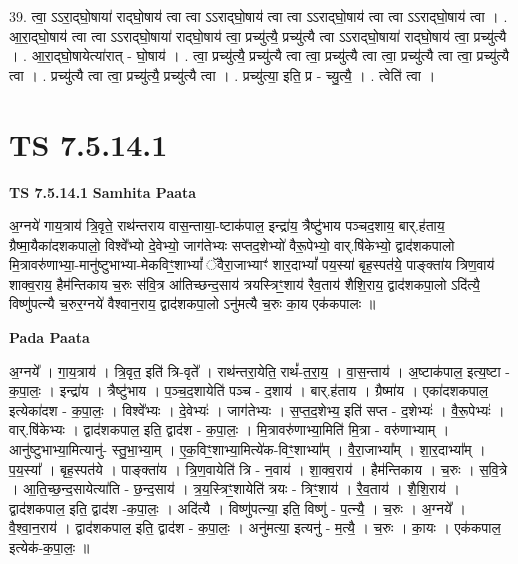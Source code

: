 \documentclass[17pt]{extarticle}
\begin{document}
39. त्वा॒ ऽऽरा॒द्‍घो॒षाया॑ राद्‍घो॒षाय॑ त्वा त्वा ऽऽराद्‍घो॒षाय॑ त्वा त्वा ऽऽराद्‍घो॒षाय॑ त्वा त्वा ऽऽराद्‍घो॒षाय॑ त्वा । . आ॒रा॒द्‍घो॒षाय॑ त्वा त्वा ऽऽराद्‍घो॒षाया॑ राद्‍घो॒षाय॑ त्वा॒ प्रच्यु॑त्यै॒ प्रच्यु॑त्यै त्वा ऽऽराद्‍घो॒षाया॑ राद्‍घो॒षाय॑ त्वा॒ प्रच्यु॑त्यै । . आ॒रा॒द्‍घो॒षायेत्या॑रात् - घो॒षाय॑ । . त्वा॒ प्रच्यु॑त्यै॒ प्रच्यु॑त्यै त्वा त्वा॒ प्रच्यु॑त्यै त्वा त्वा॒ प्रच्यु॑त्यै त्वा त्वा॒ प्रच्यु॑त्यै त्वा । . प्रच्यु॑त्यै त्वा त्वा॒ प्रच्यु॑त्यै॒ प्रच्यु॑त्यै त्वा । . प्रच्यु॑त्या॒ इति॒ प्र - च्यु॒त्यै॒ । . त्वेति॑ त्वा । \newline
\pagebreak
{}

\section{ TS 7.5.14.1 }

\textbf{TS 7.5.14.1 } \newline
\textbf{Samhita Paata} \newline

अ॒ग्नये॑ गाय॒त्राय॑ त्रि॒वृते॒ राथ॑न्तराय वास॒न्ताया॒-ष्टाक॑पाल॒ इन्द्रा॑य॒ त्रैष्टु॑भाय पञ्चद॒शाय॒ बार्.ह॑ताय॒ ग्रैष्मा॒यैका॑दशकपालो॒ विश्वे᳚भ्यो दे॒वेभ्यो॒ जाग॑तेभ्यः सप्तद॒शेभ्यो॑ वैरू॒पेभ्यो॒ वार्.षि॑केभ्यो॒ द्वाद॑शकपालो मि॒त्रावरु॑णाभ्या॒-मानु॑ष्टुभाभ्या-मेकविꣳ॒॒शाभ्यां᳚ ॅवैरा॒जाभ्याꣳ॑ शार॒दाभ्यां᳚ पय॒स्या॑ बृह॒स्पत॑ये॒ पाङ्क्ता॑य त्रिण॒वाय॑ शाक्व॒राय॒ हैम॑न्तिकाय च॒रुः स॑वि॒त्र आ॑तिच्छन्द॒साय॑ त्रयस्त्रिꣳ॒॒शाय॑ रैव॒ताय॑ शैशि॒राय॒ द्वाद॑शकपा॒लो ऽदि॑त्यै॒ विष्णु॑पत्न्यै च॒रुर॒ग्नये॑ वैश्वान॒राय॒ द्वाद॑शकपा॒लो ऽनु॑मत्यै च॒रुः का॒य एक॑कपालः ॥ \newline

\textbf{Pada Paata} \newline

अ॒ग्नये᳚ । गा॒य॒त्राय॑ । त्रि॒वृत॒ इति॑ त्रि-वृते᳚ । राथ॑न्तरा॒येति॒ राथं᳚-त॒रा॒य॒ । वा॒स॒न्ताय॑ । अ॒ष्टाक॑पाल॒ इत्य॒ष्टा - क॒पा॒लः॒ । इन्द्रा॑य । त्रैष्टु॑भाय । प॒ञ्च॒द॒शायेति॑ पञ्च - द॒शाय॑ । बार्.ह॑ताय । ग्रैष्मा॑य । एका॑दशकपाल॒ इत्येका॑दश - क॒पा॒लः॒ । विश्वे᳚भ्यः । दे॒वेभ्यः॑ । जाग॑तेभ्यः । स॒प्त॒द॒शेभ्य॒ इति॑ सप्त - द॒शेभ्यः॑ । वै॒रू॒पेभ्यः॑ । वार्.षि॑केभ्यः । द्वाद॑शकपाल॒ इति॒ द्वाद॑श - क॒पा॒लः॒ । मि॒त्रावरु॑णाभ्या॒मिति॑ मि॒त्रा - वरु॑णाभ्याम् । आनु॑ष्टुभाभ्या॒मित्यानु॑- स्तु॒भा॒भ्या॒म् । ए॒क॒विꣳ॒॒शाभ्या॒मित्ये॑क-विꣳ॒॒शाभ्या᳚म् । वै॒रा॒जाभ्या᳚म् । शा॒र॒दाभ्या᳚म् । प॒य॒स्या᳚ । बृह॒स्पत॑ये । पाङ्क्ता॑य । त्रि॒ण॒वायेति॑ त्रि - न॒वाय॑ । शा॒क्व॒राय॑ । हैम॑न्तिकाय । च॒रुः । स॒वि॒त्रे । आ॒ति॒च्छ॒न्द॒सायेत्या॑ति - छ॒न्द॒साय॑ । त्र॒य॒स्त्रिꣳ॒॒शायेति॑ त्रयः - त्रिꣳ॒॒शाय॑ । रै॒व॒ताय॑ । शै॒शि॒राय॑ । द्वाद॑शकपाल॒ इति॒ द्वाद॑श -क॒पा॒लः॒ । अदि॑त्यै । विष्णु॑पत्न्या॒ इति॒ विष्णु॑ - प॒त्न्यै॒ । च॒रुः । अ॒ग्नये᳚ । वै॒श्वा॒न॒राय॑ । द्वाद॑शकपाल॒ इति॒ द्वाद॑श - क॒पा॒लः॒ । अनु॑मत्या॒ इत्यनु॑ - म॒त्यै॒ । च॒रुः । का॒यः । एक॑कपाल॒ इत्येक॑-क॒पा॒लः॒ ॥  \newline
\end{document}
